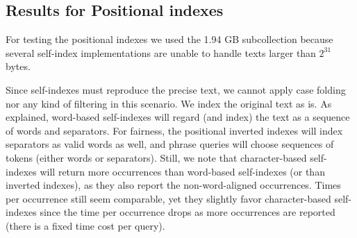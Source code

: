 \documentclass[review]{elsarticle}
\begin{document}
\subsection{Results for Positional indexes}

For testing the positional indexes we used the 1.94 GB subcollection 
because several self-index implementations are unable to handle 
texts larger than $2^{31}$ bytes. 

Since self-indexes must reproduce the precise text, we cannot apply case
folding nor any kind of filtering in this scenario. We index the original text
as is. As explained, word-based self-indexes will regard (and index) the text 
as a sequence of words and separators. For fairness, the positional inverted 
indexes will index separators as valid words as well, and phrase queries will 
choose sequences of tokens (either words or separators). Still, we note that
character-based self-indexes will return more occurrences than word-based
self-indexes (or than inverted indexes), as they also report the
non-word-aligned occurrences. Times per occurrence still seem comparable, yet
they slightly favor character-based self-indexes since
the time per occurrence drops as more occurrences are reported (there is a
fixed time cost per query). 
\end{document}
